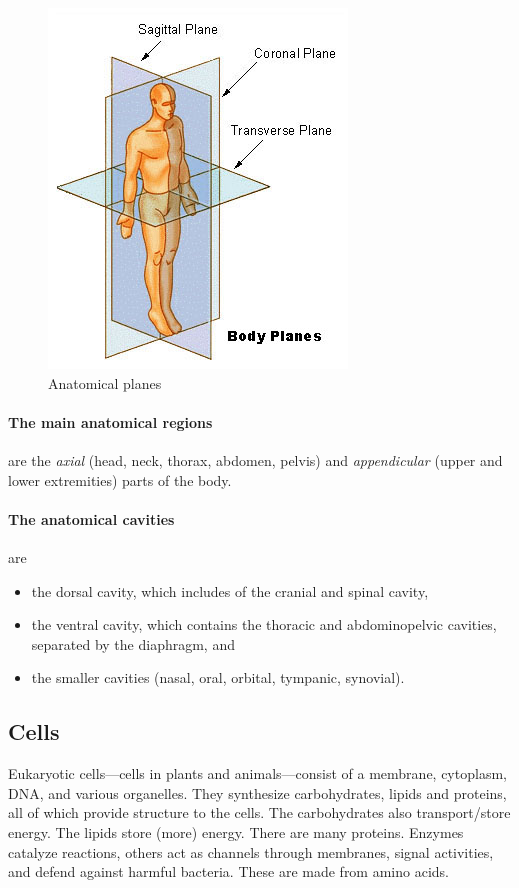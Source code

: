 \begin{figure}[htbp]
  \centering
  \includegraphics[width=0.6\linewidth]{img/BodyPlanes.jpg}
  \caption{Anatomical planes}
  \label{fig:planes}
\end{figure}

\paragraph{The main anatomical regions} are the \emph{axial} (head, neck, thorax, abdomen, pelvis) and \emph{appendicular} (upper and lower extremities) parts of the body.

\paragraph{The anatomical cavities} are
\begin{itemize}
  \item the dorsal cavity, which includes of the cranial and spinal cavity,
  \item the ventral cavity, which contains the thoracic and abdominopelvic cavities, separated by the diaphragm, and
  \item the smaller cavities (nasal, oral, orbital, tympanic, synovial).
\end{itemize}

\subsection{Cells}
Eukaryotic cells---cells in plants and animals---consist of a membrane, cytoplasm, DNA, and various organelles. They synthesize carbohydrates, lipids and proteins, all of which provide structure to the cells. The carbohydrates also transport/store energy. The lipids store (more) energy. There are many proteins. Enzymes catalyze reactions, others act as channels through membranes, signal activities, and defend against harmful bacteria. These are made from amino acids.

